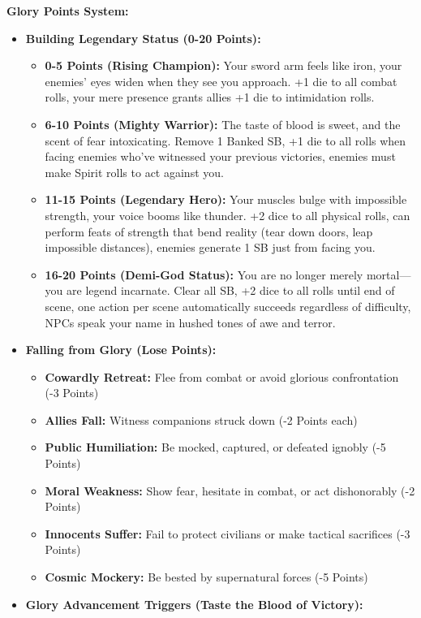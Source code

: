 \documentclass[11pt]{article}
\begin{document}
\textbf{Glory Points System:}
\begin{itemize}
\item \textbf{Building Legendary Status (0-20 Points):}
  \begin{itemize}
  \item \textbf{0-5 Points (Rising Champion):} Your sword arm feels like iron, your enemies' eyes widen when they see you approach. +1 die to all combat rolls, your mere presence grants allies +1 die to intimidation rolls.
  \item \textbf{6-10 Points (Mighty Warrior):} The taste of blood is sweet, and the scent of fear intoxicating. Remove 1 Banked SB, +1 die to all rolls when facing enemies who've witnessed your previous victories, enemies must make Spirit rolls to act against you.
  \item \textbf{11-15 Points (Legendary Hero):} Your muscles bulge with impossible strength, your voice booms like thunder. +2 dice to all physical rolls, can perform feats of strength that bend reality (tear down doors, leap impossible distances), enemies generate 1 SB just from facing you.
  \item \textbf{16-20 Points (Demi-God Status):} You are no longer merely mortal—you are legend incarnate. Clear all SB, +2 dice to all rolls until end of scene, one action per scene automatically succeeds regardless of difficulty, NPCs speak your name in hushed tones of awe and terror.
  \end{itemize}
\item \textbf{Falling from Glory (Lose Points):}
  \begin{itemize}
  \item \textbf{Cowardly Retreat:} Flee from combat or avoid glorious confrontation (-3 Points)
  \item \textbf{Allies Fall:} Witness companions struck down (-2 Points each)
  \item \textbf{Public Humiliation:} Be mocked, captured, or defeated ignobly (-5 Points)
  \item \textbf{Moral Weakness:} Show fear, hesitate in combat, or act dishonorably (-2 Points)
  \item \textbf{Innocents Suffer:} Fail to protect civilians or make tactical sacrifices (-3 Points)
  \item \textbf{Cosmic Mockery:} Be bested by supernatural forces (-5 Points)
  \end{itemize}
\item \textbf{Glory Advancement Triggers (Taste the Blood of Victory):}

\end{itemize}
\end{document}
